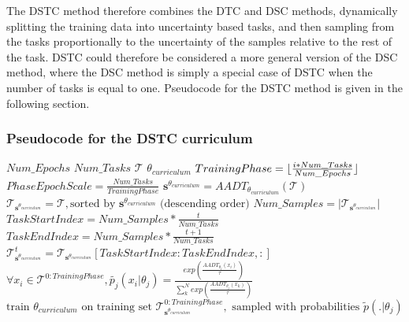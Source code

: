 The DSTC method therefore combines the DTC and DSC methods, dynamically splitting the training data into uncertainty based tasks, and then sampling from the tasks proportionally to the uncertainty of the samples relative to the rest of the task. DSTC could therefore be considered a more general version of the DSC method, where the DSC method is simply a special case of DSTC when the number of tasks is equal to one. Pseudocode for the DSTC method is given in the following section.

\subsubsection{Pseudocode for the DSTC curriculum}\label{sec:DSTCPseudocode}
\begin{algorithmic}
\REQUIRE $Num\_Epochs$
\REQUIRE $Num\_Tasks$
\REQUIRE $\mathcal{T}$ 
\REQUIRE $\theta_{curriculum}$ 
\STATE $TrainingPhase = \lfloor\frac{i*Num\_Tasks}{Num\_Epochs}\rfloor$
\STATE $PhaseEpochScale = \frac{Num\_Tasks}{TrainingPhase}$
\STATE $\mathbf{s}^{\theta_{curriculum}} = AADT_{\theta_{curriculum}}(\mathcal{T})$
\STATE $\mathcal{T}_{\mathbf{s}^{\theta_{curriculum}}} = \mathcal{T}, \text{sorted by } \mathbf{s}^{\theta_{curriculum}} \text{ (descending order)}$ 
\STATE $Num\_Samples = |\mathcal{T}_{\mathbf{s}^{\theta_{curriculum}}}|$
\STATE $TaskStartIndex = Num\_Samples*\frac{t}{Num\_Tasks} $
\STATE $TaskEndIndex = Num\_Samples*\frac{t+1}{Num\_Tasks} $
\STATE $\mathcal{T}^{t}_{\mathbf{s}^{\theta_{curriculum}}} = \mathcal{T}_{\mathbf{s}^{\theta_{curriculum}}}[TaskStartIndex:TaskEndIndex,:] $
\ENDFOR
\STATE $\forall x_i \in \mathcal{T}^{0:TrainingPhase}, \tilde{p_j}(x_i | \theta_j) = \frac{exp(\frac{AADT_{\theta_j}(x_i)}{\tau})}{\sum_{k}^{N} exp(\frac{AADT_{\theta_j}(x_k)}{\tau})}$
\STATE $\text{train }  \theta_{curriculum} \text{ on training set } \mathcal{T}^{0:TrainingPhase}_{\mathbf{s}^{\theta_{curriculum}}}, \text{ sampled with probabilities }  \tilde{p}(. | \theta_j)   $
\ENDFOR
\ENDFOR
\end{algorithmic}

